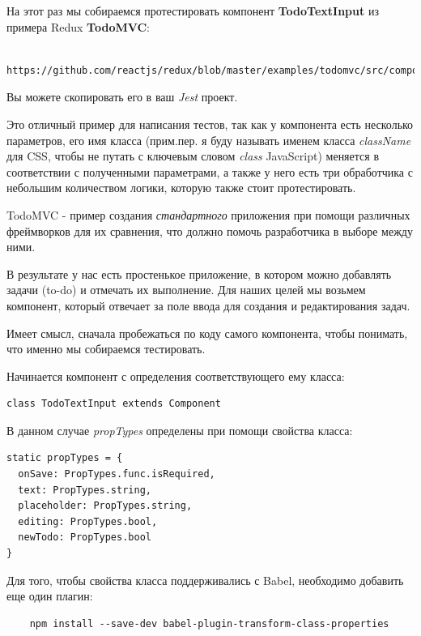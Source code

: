 На этот раз мы собираемся протестировать компонент \textbf{TodoTextInput} из примера Redux \textbf{TodoMVC}:

\begin{lstlisting}
	https://github.com/reactjs/redux/blob/master/examples/todomvc/src/components/TodoTextInput.js
\end{lstlisting}

Вы можете скопировать его в ваш \textit{Jest} проект.

Это отличный пример для написания тестов, так как у компонента есть несколько параметров, его имя класса (прим.пер. я буду называть именем класса \textit{className} для CSS, чтобы не путать с ключевым словом \textit{class} JavaScript) меняется в соответствии с полученными параметрами, а также у него есть три обработчика с небольшим количеством логики, которую также стоит протестировать.

TodoMVC - пример создания \textit{стандартного} приложения при помощи различных фреймворков для их сравнения, что должно помочь разработчика в выборе между ними.

В результате у нас есть простенькое приложение, в котором можно добавлять задачи (to-do) и отмечать их выполнение. Для наших целей мы возьмем компонент, который отвечает за поле ввода для создания и редактирования задач. 

Имеет смысл, сначала пробежаться по коду самого компонента, чтобы понимать, что именно мы собираемся тестировать.

Начинается компонент с определения соответствующего ему класса:

\begin{lstlisting}
class TodoTextInput extends Component
\end{lstlisting}

В данном случае \textit{propTypes} определены при помощи свойства класса:

\begin{lstlisting}
static propTypes = {
  onSave: PropTypes.func.isRequired,
  text: PropTypes.string,
  placeholder: PropTypes.string,
  editing: PropTypes.bool,
  newTodo: PropTypes.bool
}
\end{lstlisting}

Для того, чтобы свойства класса поддерживались с Babel, необходимо добавить еще один плагин:

\begin{lstlisting}
	npm install --save-dev babel-plugin-transform-class-properties
\end{lstlisting}

